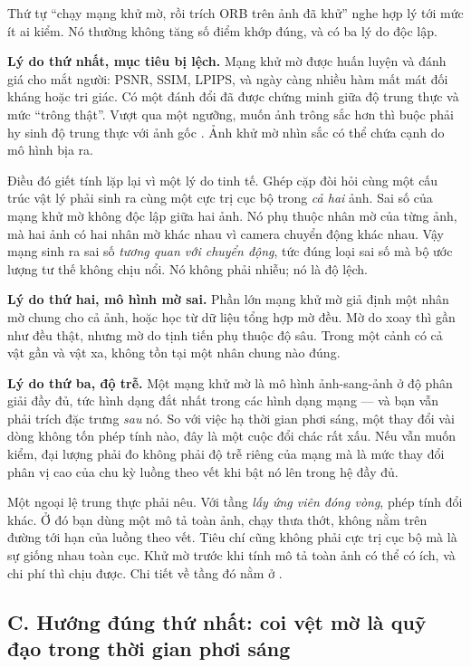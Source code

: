 \documentclass[../../deep_learning.tex]{subfiles}
\begin{document}
Thứ tự ``chạy mạng khử mờ, rồi trích ORB trên ảnh đã khử'' nghe hợp lý tới mức ít ai kiểm. Nó thường không tăng số điểm khớp đúng, và có ba lý do độc lập.

\textbf{Lý do thứ nhất, mục tiêu bị lệch.} Mạng khử mờ được huấn luyện và đánh giá cho mắt người: PSNR, SSIM, LPIPS, và ngày càng nhiều hàm mất mát đối kháng hoặc tri giác. Có một đánh đổi đã được chứng minh giữa độ trung thực và mức ``trông thật''. Vượt qua một ngưỡng, muốn ảnh trông sắc hơn thì buộc phải hy sinh độ trung thực với ảnh gốc \cite{blau2018perception}. Ảnh khử mờ nhìn sắc có thể chứa cạnh do mô hình bịa ra.

Điều đó giết tính lặp lại vì một lý do tinh tế. Ghép cặp đòi hỏi cùng một cấu trúc vật lý phải sinh ra cùng một cực trị cục bộ trong \emph{cả hai} ảnh. Sai số của mạng khử mờ không độc lập giữa hai ảnh. Nó phụ thuộc nhân mờ của từng ảnh, mà hai ảnh có hai nhân mờ khác nhau vì camera chuyển động khác nhau. Vậy mạng sinh ra sai số \emph{tương quan với chuyển động}, tức đúng loại sai số mà bộ ước lượng tư thế không chịu nổi. Nó không phải nhiễu; nó là độ lệch.

\textbf{Lý do thứ hai, mô hình mờ sai.} Phần lớn mạng khử mờ giả định một nhân mờ chung cho cả ảnh, hoặc học từ dữ liệu tổng hợp mờ đều. Mờ do xoay thì gần như đều thật, nhưng mờ do tịnh tiến phụ thuộc độ sâu. Trong một cảnh có cả vật gần và vật xa, không tồn tại một nhân chung nào đúng.

\textbf{Lý do thứ ba, độ trễ.} Một mạng khử mờ là mô hình ảnh-sang-ảnh ở độ phân giải đầy đủ, tức hình dạng đắt nhất trong các hình dạng mạng --- và bạn vẫn phải trích đặc trưng \emph{sau} nó. So với việc hạ thời gian phơi sáng, một thay đổi vài dòng không tốn phép tính nào, đây là một cuộc đổi chác rất xấu. Nếu vẫn muốn kiểm, đại lượng phải đo không phải độ trễ riêng của mạng mà là mức thay đổi phân vị cao của chu kỳ luồng theo vết khi bật nó lên trong hệ đầy đủ.

Một ngoại lệ trung thực phải nêu. Với tầng \emph{lấy ứng viên đóng vòng}, phép tính đổi khác. Ở đó bạn dùng một mô tả toàn ảnh, chạy thưa thớt, không nằm trên đường tới hạn của luồng theo vết. Tiêu chí cũng không phải cực trị cục bộ mà là sự giống nhau toàn cục. Khử mờ trước khi tính mô tả toàn ảnh có thể có ích, và chi phí thì chịu được. Chi tiết về tầng đó nằm ở .

\subsection{C. Hướng đúng thứ nhất: coi vệt mờ là quỹ đạo trong thời gian phơi sáng}
\end{document}
